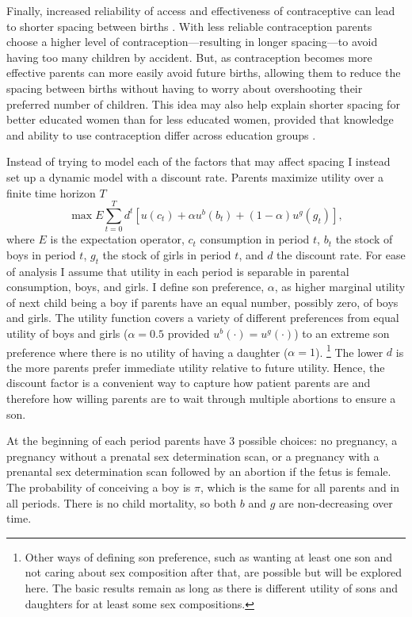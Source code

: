 \documentclass[12pt,letterpaper]{article}
\begin{document}
Finally, increased reliability of access and effectiveness of
contraceptive can lead to shorter spacing between births 
\citep{Keyfitz1971,Heckman1976}.
With less reliable contraception parents choose a higher level of 
contraception---resulting in longer spacing---to avoid having 
too many children by accident.
But, as contraception becomes more effective parents can more
easily avoid future births, allowing them to reduce the spacing 
between births without having to worry about overshooting their 
preferred number of children.
This idea may also help explain shorter spacing for better 
educated women than for less educated women, provided that   
knowledge and ability to use contraception differ
across education groups \citep{Tulasidhar1993,Whitworth2002}.


Instead of trying to model each of the factors that may affect
spacing I instead set up a dynamic model with a discount rate.
Parents maximize utility over a finite time horizon $T$
\begin{equation}
\max E \sum_{t=0}^T d^t [ 
u(c_t) + \alpha u^b(b_t) + (1-\alpha) u^g(g_t) 
],
\label{eq:utility_1}
\end{equation}
where $E$ is the expectation operator,
$c_t$ consumption in period $t$, 
$b_t$ the stock of boys in period $t$,
$g_t$ the stock of girls in period $t$, and
$d$ the discount rate.
For ease of analysis I assume that utility in each period is separable in 
parental consumption, boys, and girls.
I define son preference, $\alpha$, as higher marginal utility of next child 
being a boy if parents have an equal number, possibly zero, of boys and girls.
The utility function covers a variety of different preferences 
from equal utility of boys and girls ($\alpha = 0.5$ provided
$u^b(\cdot) = u^g(\cdot)$) to an extreme 
son preference where there is no utility of having a daughter 
($\alpha = 1$).%
\footnote{
Other ways of defining son preference, such as wanting at least one son 
and not caring about sex composition after that, are possible but 
will be explored here.
The basic results remain as long as there is different
utility of sons and daughters for at least some sex compositions.
}
The lower $d$ is the more parents prefer immediate utility relative
to future utility.
Hence, the discount factor is a convenient way to capture how patient parents 
are and therefore how willing parents are to wait through multiple abortions 
to ensure a son. 

At the beginning of each period parents have 3 possible choices:
no pregnancy, a pregnancy without a prenatal sex determination scan,
or a pregnancy with a prenantal sex determination scan followed by an
abortion if the fetus is female.
The probability of conceiving a boy is $\pi$, which is
the same for all parents and in all periods.
There is no child mortality, so both
$b$ and $g$ are non-decreasing over time.
\end{document}
